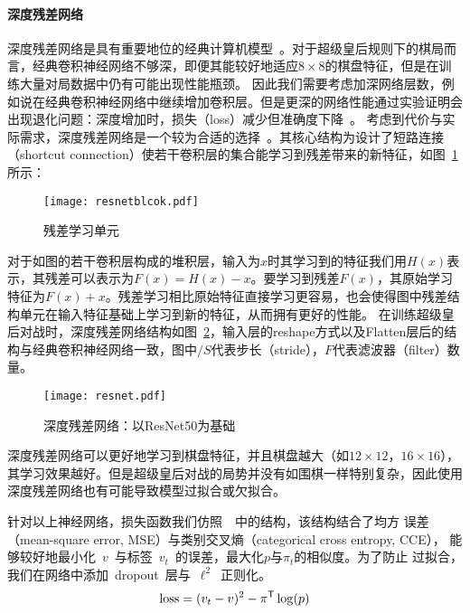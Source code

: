 \paragraph{深度残差网络}
深度残差网络是具有重要地位的经典计算机模型~\cite{resnet}。对于超级皇后规则下的棋局而言，经典卷积神经网络不够深，即便其能较好地适应$8\times8$的棋盘特征，但是在训练大量对局数据中仍有可能出现性能瓶颈。
因此我们需要考虑加深网络层数，例如说在经典卷积神经网络中继续增加卷积层。但是更深的网络性能通过实验证明会出现退化问题：深度增加时，损失（loss）减少但准确度下降~\cite{resnet,he2016identity}。
考虑到代价与实际需求，深度残差网络是一个较为合适的选择~\cite{resnet}。其核心结构为设计了短路连接（shortcut connection）使若干卷积层的集合能学习到残差带来的新特征，如图~\ref{fig:resunit}所示：
\begin{figure}[H]
    \centering
    \texttt{[image: resnetblcok.pdf]}
    \caption[resunit]{%
    残差学习单元~\cite{resnet}%
      }
    \label{fig:resunit}
\end{figure}
对于如图的若干卷积层构成的堆积层，输入为$x$时其学习到的特征我们用$H(x)$表示，其残差可以表示为$F(x)=H(x)-x$。要学习到残差$F(x)$，其原始学习特征为$F(x)+x$。残差学习相比原始特征直接学习更容易，也会使得图中残差结构单元在输入特征基础上学习到新的特征，从而拥有更好的性能。
在训练超级皇后对战时，深度残差网络结构如图~\ref{fig:res}，输入层的reshape方式以及Flatten层后的结构与经典卷积神经网络一致，图中$/S$代表步长（stride），$F$代表滤波器（filter）数量。
\begin{figure}[H]
    \centering
    \texttt{[image: resnet.pdf]}
    \caption[res]{%
    深度残差网络：以ResNet50为基础~\cite{resnet}%
      }
    \label{fig:res}
\end{figure}
深度残差网络可以更好地学习到棋盘特征，并且棋盘越大（如$12\times12$，$16\times16$），其学习效果越好。但是超级皇后对战的局势并没有如围棋一样特别复杂，因此使用深度残差网络也有可能导致模型过拟合或欠拟合。

针对以上神经网络，损失函数我们仿照~\cite{Silver2017}~中的结构，该结构结合了均方
误差（mean-square error, MSE）与类别交叉熵（categorical cross entropy, CCE），
能够较好地最小化~$v$~与标签~$v_{t}$~的误差，最大化$p$与$\pi_{t}$的相似度。为了防止
过拟合，我们在网络中添加~dropout~层与~$\ell^2$~正则化。
\begin{equation}
    \text{loss} = (v_{t}-v)^{2} - \pi^{\mathsf T}\log(p)
\end{equation}

